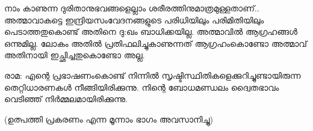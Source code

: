 നാം കാണുന്ന ദുരിതാനുഭവങ്ങളെല്ലാം ശരീരത്തിനുമാത്രമുള്ളതാണ്‌..  അത്മാവാകട്ടെ ഇന്ദ്രിയസംവേദനങ്ങളുടെ പരിധിയിലും പരിമിതിയിലും പെടാത്തതുകൊണ്ട് അതിനെ ദു:ഖം ബാധിക്കയില്ല. അത്മാവിൽ ആഗ്രഹങ്ങൾ ഒന്നുമില്ല. ലോകം അതിൽ പ്രതിഫലിച്ചുകാണുന്നത് ആഗ്രഹംകൊണ്ടോ അത്മാവ് അതിനായി ഇച്ഛിച്ചതുകൊണ്ടോ അല്ല.

രാമ: എന്റെ പ്രഭാഷണംകൊണ്ട് നിന്നിൽ സൃഷ്ടിസ്ഥിതികളെക്കുറിച്ചുണ്ടായിരുന്ന തെറ്റിധാരണകൾ നീങ്ങിയിരിക്കുന്നു. നിന്റെ ബോധമണ്ഡലം ദ്വൈതഭാവം വെടിഞ്ഞ് നിർമ്മലമായിരിക്കുന്നു.

(ഉത്പത്തി പ്രകരണം എന്ന മൂന്നാം ഭാഗം അവസാനിച്ചു)


